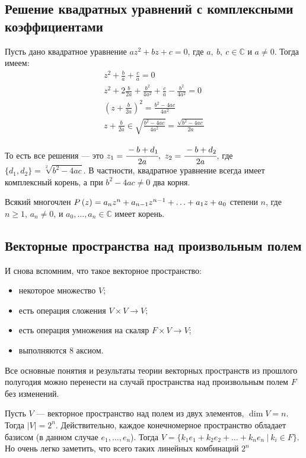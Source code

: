 \subsection{Решение квадратных уравнений с комплексными коэффициентами}

Пусть дано квадратное уравнение $az^2+bz+c=0$, где $a,\ b,\ c\in\mathbb{C}$ и 	$ a \neq 0$. Тогда имеем:
\begin{gather*}
    z^2+\frac{b}{a}+\frac{c}{a} = 0\\
    z^2+2\frac{b}{2a}+\frac{b^2}{4a^2}+\frac{c}{a}-\frac{b^2}{4a^2} = 0\\
    \left(z+\frac{b}{2a}\right)^2=\frac{b^2-4ac}{4a^2}\\
    z+\frac{b}{2a} \in \sqrt{\frac{b^2-4ac}{4a^2}}=\frac{\sqrt{b^2-4ac}}{2a}
\end{gather*}

То есть все решения --- это $z_1 = \cfrac{-b+d_1}{2a},\ z_2 = \cfrac{-b+d_2}{2a}$, где $\{d_1,d_2\} = \sqrt[2]{b^2-4ac}$. В частности, квадратное уравнение всегда имеет комплексный корень, а при $b^2-4ac\neq0$ два корня.

\begin{Theorem}
Всякий многочлен $P\left(z\right) = a_nz^n + a_{n-1}z^{n-1} + \ldots \hm{+} a_1z + a_0$ степени $n$, где $n \geqslant 1$, $a_n \neq 0$, и $a_0,\ldots,a_n \in \mathbb{C}$ имеет корень.
\end{Theorem}

\subsection{Векторные пространства над произвольным полем}

И снова вспомним, что такое векторное пространство:

\begin{itemize}
    \item некоторое множество $V$;
    \item есть операция сложения $V\times V\rightarrow V$;
    \item есть операция умножения на скаляр $F\times V\rightarrow V$;
    \item выполняются 8 аксиом.
\end{itemize}

Все основные понятия и результаты теории векторных пространств из прошлого полугодия можно перенести на случай пространства над произвольным полем $F$ без изменений.

\begin{Examples}
Пусть $V$ --- векторное пространство над полем из двух элементов, $\dim V = n$. Тогда $|V| = 2^n$. Действительно, каждое конечномерное пространство обладает базисом (в данном случае $e_1,\ldots,e_n$). Тогда $V = \{k_1e_1+k_2e_2+\ldots+k_ne_n\ |\ k_i\in F\}$. Но очень легко заметить, что всего таких линейных комбинаций $2^n$
\end{Examples}

